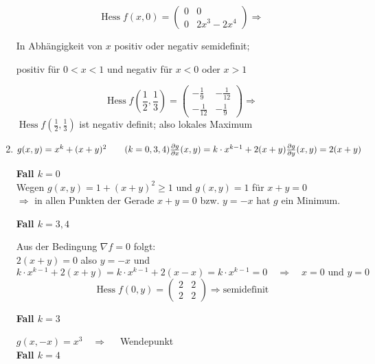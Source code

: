 \documentclass[ngerman, a4paper]{scrartcl}
\DeclareMathOperator{\Hessian}{Hess}
\newcommand{\partder}[2]{\tfrac{\partial #1}{\partial #2}}
\begin{document}
\begin{enumerate}[\textbf{\alph*)}]
		\[
			\Hessian f(x, 0) =
			\begin{pmatrix}
				0 & 0\\
				0 & 2x^3 - 2x^4
			\end{pmatrix}
			\Rightarrow
		\]
		
		In Abhängigkeit von $x$ positiv oder negativ semidefinit;
		
		positiv für $0 < x < 1$ und negativ für $x < 0$ oder $x > 1$
		
		\[
			\Hessian f(\frac{1}{2}, \frac{1}{3}) = 
			\begin{pmatrix}
				-\frac{1}{9} & -\frac{1}{12} \\
				-\frac{1}{12} & -\frac{1}{9}
			\end{pmatrix}
			\Rightarrow
		\]
		$\Hessian f(\frac{1}{2}, \frac{1}{3})$ ist negativ definit; also lokales Maximum
		\item 
		$
		g(x,y) = x^k+(x+y)^2 \qquad (k=0,3,4)\\
		\partder{g}{x}(x,y) = k\cdot x^{k-1} + 2(x + y)\\
		\partder{g}{y}(x,y) = 2(x + y)
		$
		\\
		
		
		\begin{samepage}
			\textbf{Fall $k = 0$}\\
			Wegen $g(x,y) = 1 + (x + y)^2 \ge 1$ und $g(x,y) = 1$ für $x + y = 0$\\
			$\Rightarrow$ in allen Punkten der Gerade $x + y = 0$ bzw. $y = -x$ hat $g$ ein Minimum.
		\end{samepage}
	
		\textbf{Fall $k = 3,4$}
		
		Aus der Bedingung $\nabla f = 0$ folgt:\\
		
		$2(x + y) = 0$ also $y = -x$ und\\
		$k\cdot x^{k-1} + 2(x + y) = k\cdot x^{k-1} + 2(x - x) = k\cdot x^{k-1} = 0 \quad \Rightarrow \quad  x = 0 \text{ und } y = 0$
		\[
			\Hessian f(0,y) = 
			\begin{pmatrix}
				2 & 2\\
				2 & 2
			\end{pmatrix}
			\Rightarrow \text{semidefinit}
		\]
		
		\textbf{Fall $k = 3$}
		
		$g(x, -x) = x^3 \quad \Rightarrow \quad$ Wendepunkt\\
		
		\textbf{Fall $k = 4$}
		

\end{enumerate}
\end{document}
